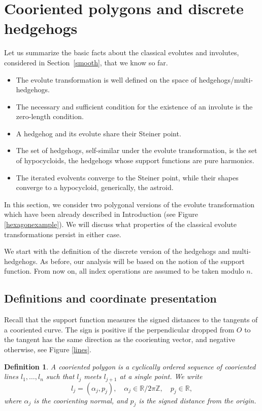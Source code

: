 \documentclass[12pt]{article}
\newtheorem{definition}[lemma]{Definition}
\newcommand{\R}{\mathbb {R}}
\newcommand{\Z}{\mathbb{Z}}
\begin{document}
\section{Cooriented polygons and discrete hedgehogs} \label{PolygonsHedgehogs} 

Let us summarize the basic facts about the classical evolutes and involutes,  considered in Section~\ref{smooth}, that we know so far.
\begin{itemize}
\item The evolute transformation is well defined on the space of hedgehogs/multi-hedgehogs. 
\item The necessary and sufficient condition for the existence of an involute is the zero-length condition.
\item A hedgehog and its evolute share their Steiner point.
\item The set of hedgehogs, self-similar under the evolute transformation, is the set of hypocycloids, the  hedgehogs whose support functions are pure harmonics.
\item The iterated evolvents converge to the Steiner point, while their shapes converge to a hypocycloid, generically, the astroid. 
\end{itemize}

In this section, we consider two polygonal versions of the evolute transformation which have been already described in Introduction (see Figure \ref{hexagonexample}). We will discuss what properties of the classical evolute transformations persist in either case. 

We start with the definition of the discrete version of the hedgehogs and multi-hedgehogs. As before, our analysis will be based on the notion of the support function. From now on, all index operations are assumed to be taken modulo $n$.
 
\subsection{Definitions and coordinate presentation} \label{DefCoord} Recall that the support function measures the signed distances to the tangents of a cooriented curve. The sign is positive if the perpendicular dropped from $O$ to the tangent has the same direction as the coorienting vector, and negative otherwise, see Figure \ref{lines}.

\begin{definition}
\label{coor_polyg}
A \emph{cooriented polygon} is a cyclically ordered sequence of cooriented lines $l_1, \ldots, l_n$ such that $l_j$ meets $l_{j+1}$ at a single point. We write \[l_j = (\alpha_j, p_j), \quad \alpha_j \in \R/2\pi\Z, \quad p_j \in \R,\] where $\alpha_j$ is the coorienting normal, and $p_j$ is the signed distance from the origin.\end{definition}
\end{document}
